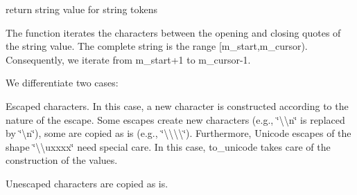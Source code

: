 return string value for string tokens 

The function iterates the characters between the opening and closing quotes of the string value. The complete string is the range \mbox{[}m\+\_\+start,m\+\_\+cursor). Consequently, we iterate from m\+\_\+start+1 to m\+\_\+cursor-\/1.

We differentiate two cases\+:


\begin{DoxyEnumerate}
\item Escaped characters. In this case, a new character is constructed according to the nature of the escape. Some escapes create new characters (e.\+g., {\ttfamily \char`\"{}\textbackslash{}\textbackslash{}n\char`\"{}} is replaced by {\ttfamily \char`\"{}\textbackslash{}n\char`\"{}}), some are copied as is (e.\+g., {\ttfamily \char`\"{}\textbackslash{}\textbackslash{}\textbackslash{}\textbackslash{}\char`\"{}}). Furthermore, Unicode escapes of the shape {\ttfamily \char`\"{}\textbackslash{}\textbackslash{}uxxxx\char`\"{}} need special care. In this case, to\+\_\+unicode takes care of the construction of the values.
\item Unescaped characters are copied as is.
\end{DoxyEnumerate}

